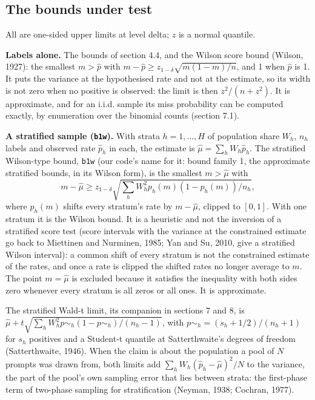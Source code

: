 \documentclass[11pt]{article}
\begin{document}
\subsection{The bounds under test}

All are one-sided upper limits at level delta; $z$ is a normal quantile.


\textbf{Labels alone.} The bounds of section 4.4, and the Wilson score bound (Wilson, 1927): the smallest $m > \hat{p}$ with $m - \hat{p} \ge z_{1-\delta } \sqrt{m (1 - m ) / n}$, and 1 when $\hat{p}$ is 1. It puts the variance at the hypothesised rate and not at the estimate, so its width is not zero when no positive is observed: the limit is then $z ^{2} / (n + z ^{2})$. It is approximate, and for an i.i.d. sample its miss probability can be computed exactly, by enumeration over the binomial counts (section 7.1).


\textbf{A stratified sample (\texttt{b1w}).} With strata $h = 1,\dots,H$ of population share $W_{h}$, $n_{h}$ labels and observed rate $\hat{p}_{h}$ in each, the estimate is $\hat{\mu} = \sum_{h} W_{h} \hat{p}_{h}$. The stratified Wilson-type bound, \texttt{b1w} (our code's name for it: bound family 1, the approximate stratified bounds, in its Wilson form), is the smallest $m > \hat{\mu}$ with
\[
m - \hat{\mu} \ge z_{1-\delta } \sqrt{\sum_{h} W_{h} ^{2} p_{h} (m ) (1 - p_{h} (m )) / n_{h}},
\]
where $p_{h} (m )$ shifts every stratum's rate by $m - \hat{\mu}$, clipped to $[0, 1]$. With one stratum it is the Wilson bound. It is a heuristic and not the inversion of a stratified score test (score intervals with the variance at the constrained estimate go back to Miettinen and Nurminen, 1985; Yan and Su, 2010, give a stratified Wilson interval): a common shift of every stratum is not the constrained estimate of the rates, and once a rate is clipped the shifted rates no longer average to $m$. The point $m = \hat{\mu}$ is excluded because it satisfies the inequality with both sides zero whenever every stratum is all zeros or all ones. It is approximate.


The stratified Wald-t limit, its companion in sections 7 and 8, is $\hat{\mu} + t \sqrt{\sum_{h} W_{h} ^{2} p \sim _h (1 - p \sim _h ) / (n_{h} - 1)}$, with $p \sim _h = (s_{h} + 1/2) / (n_{h} + 1)$ for $s_{h}$ positives and a Student-t quantile at Satterthwaite's degrees of freedom (Satterthwaite, 1946). When the claim is about the population a pool of $N$ prompts was drawn from, both limits add $\sum_{h} W_{h} (\hat{p}_{h} - \hat{\mu} )^{2} / N$ to the variance, the part of the pool's own sampling error that lies between strata: the first-phase term of two-phase sampling for stratification (Neyman, 1938; Cochran, 1977).
\end{document}
